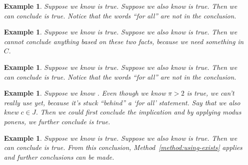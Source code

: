 \documentclass{book}
\newcounter{ekcounter}%
\theoremstyle{ekimcustom}
\newtheorem{example}[ekcounter]{Example}
\begin{document}
\begin{example}
Suppose we know  is true. Suppose we also know  is true. Then we can conclude  is true. Notice that the words ``for all'' are not in the conclusion.
\end{example}
\begin{example}
Suppose we know  is true. Suppose we also know  is true. Then we cannot conclude anything based on these two facts, because we need something in $C$.
\end{example}
\begin{example}
Suppose we know  is true. Suppose we also know  is true. Then we can conclude  is true. Notice that the words ``for all'' are not in the conclusion.
\end{example}
\begin{example}
Suppose we know . Even though we know $\pi > 2$ is true, we can't really use  yet, because it's stuck ``behind'' a `for all' statement. Say that we also knew $c \in J$. Then we could first conclude the implication  and by applying modus ponens, we further conclude  is true.
\end{example}
\begin{example}
Suppose we know  is true. Suppose we also know  is true. Then we can conclude  is true. From this conclusion, Method~\ref{method:using-exists} applies and further conclusions can be made.
\end{example}
\end{document}
